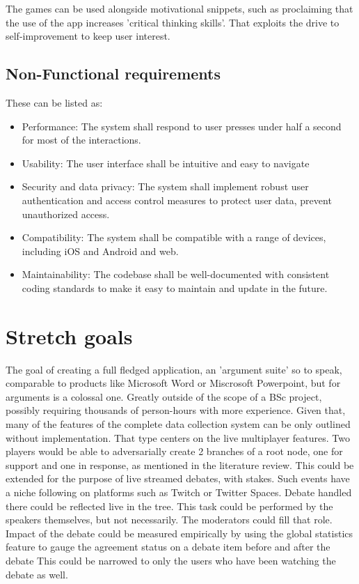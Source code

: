 \documentclass{report}
\begin{document}
The games can be used alongside motivational snippets, such as proclaiming that the use of the app increases 'critical thinking skills'. 
That exploits the drive to self-improvement to keep user interest.

\subsection{Non-Functional requirements}
These can be listed as:
\begin{itemize}
  \item Performance: The system shall respond to user presses under half a second for most of the interactions.
  \item Usability: The user interface shall be intuitive and easy to navigate
  \item Security and data privacy: The system shall implement robust user authentication and access control measures to protect user data, prevent unauthorized access.
  \item Compatibility: The system shall be compatible with a range of devices, including iOS and Android and web.
  \item Maintainability: The codebase shall be well-documented with consistent coding standards to make it easy to maintain and update in the future.
\end{itemize}

\section{Stretch goals}
The goal of creating a full fledged application, an 'argument suite' so to speak, comparable to products like Microsoft Word or Miscrosoft Powerpoint, but for arguments is a colossal one.
Greatly outside of the scope of a BSc project, possibly requiring thousands of person-hours with more experience.
Given that, many of the features of the complete data collection system can be only outlined without implementation.
That type centers on the live multiplayer features. Two players would be able to adversarially create 2 branches of a root node, one for support and one in response, as mentioned in the literature review. 
This could be extended for the purpose of live streamed debates, with stakes. Such events have a niche following on platforms such as Twitch or Twitter Spaces.
Debate handled there could be reflected live in the tree. This task could be performed by the speakers themselves, but not necessarily. The moderators could fill that role.
Impact of the debate could be measured empirically by using the global statistics feature to gauge the agreement status on a debate item before and after the debate
This could be narrowed to only the users who have been watching the debate as well.
\end{document}

